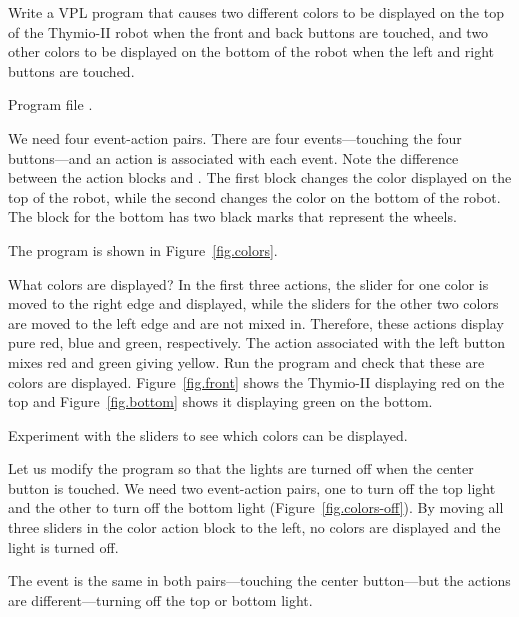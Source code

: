 

Write a VPL program that causes two different colors to be displayed on
the top of the Thymio-II robot when the front and back buttons are
touched, and two other colors to be displayed on the bottom of the robot
when the left and right buttons are touched.

{\raggedleft \hfill Program file .}

We need four event-action pairs. There are four events---touching the
four buttons---and an action is associated with each event. Note the
difference between the action blocks  and
. The first block changes the color
displayed on the top of the robot, while the second changes the color on
the bottom of the robot. The block for the bottom has two black marks
that represent the wheels.

The program is shown in Figure~\ref{fig.colors}.

What colors are displayed? In the first three actions, the slider for
one color is moved to the right edge and displayed, while the sliders
for the other two colors are moved to the left edge and are not mixed
in. Therefore, these actions display pure red, blue and green,
respectively. The action associated with the left button mixes red and
green giving yellow. Run the program and check that these are colors are
displayed. Figure~\ref{fig.front} shows the Thymio-II displaying red on
the top and Figure~\ref{fig.bottom} shows it displaying green on the
bottom.


Experiment with the sliders to see which colors can be displayed.


Let us modify the program so that the lights are turned off when the
center button is touched. We need two event-action pairs, one to turn
off the top light and the other to turn off the bottom light
(Figure~\ref{fig.colors-off}). By moving all three sliders in the color
action block to the left, no colors are displayed and the light is
turned off.

The event is the same in both pairs---touching the center button---but
the actions are different---turning off the top or bottom light. 


